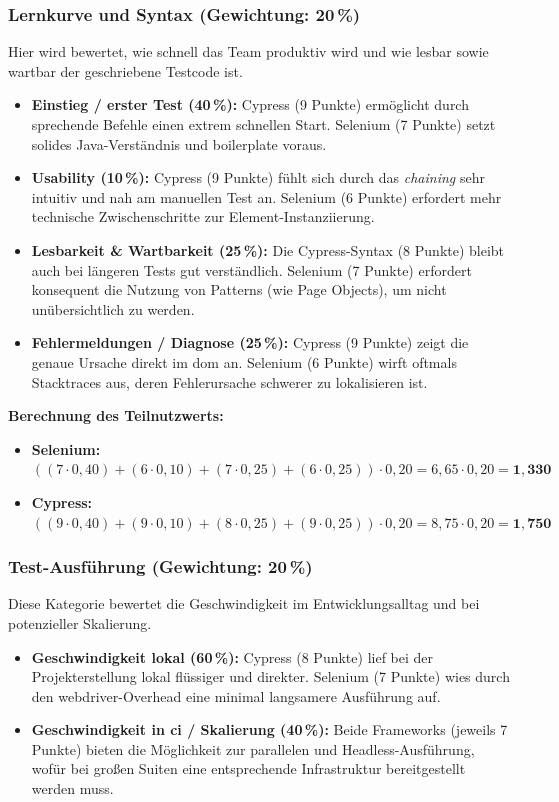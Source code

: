\subsubsection{Lernkurve und Syntax (Gewichtung: 20\,\%)}
\label{sec:eval_lernkurve}
Hier wird bewertet, wie schnell das Team produktiv wird und wie lesbar sowie wartbar der geschriebene Testcode ist.
\begin{itemize}
    \item \textbf{Einstieg / erster Test (40\,\%):} Cypress (9 Punkte) ermöglicht durch sprechende Befehle einen extrem schnellen Start. Selenium (7 Punkte) setzt solides Java-Verständnis und \gls{boilerplate} voraus.
    \item \textbf{Usability (10\,\%):} Cypress (9 Punkte) fühlt sich durch das \textit{\gls{chaining}} sehr intuitiv und nah am manuellen Test an. Selenium (6 Punkte) erfordert mehr technische Zwischenschritte zur Element-Instanziierung.
    \item \textbf{Lesbarkeit \& Wartbarkeit (25\,\%):} Die Cypress-Syntax (8 Punkte) bleibt auch bei längeren Tests gut verständlich. Selenium (7 Punkte) erfordert konsequent die Nutzung von Patterns (wie Page Objects), um nicht unübersichtlich zu werden.
    \item \textbf{Fehlermeldungen / Diagnose (25\,\%):} Cypress (9 Punkte) zeigt die genaue Ursache direkt im \gls{dom} an. Selenium (6 Punkte) wirft oftmals Stacktraces aus, deren Fehlerursache schwerer zu lokalisieren ist.
\end{itemize}

\textbf{Berechnung des Teilnutzwerts:}
\begin{itemize}
    \item[] \textbf{Selenium:} $((7 \cdot 0{,}40) + (6 \cdot 0{,}10) + (7 \cdot 0{,}25) + (6 \cdot 0{,}25)) \cdot 0{,}20 = 6{,}65 \cdot 0{,}20 = \mathbf{1{,}330}$
    \item[] \textbf{Cypress:} $((9 \cdot 0{,}40) + (9 \cdot 0{,}10) + (8 \cdot 0{,}25) + (9 \cdot 0{,}25)) \cdot 0{,}20 = 8{,}75 \cdot 0{,}20 = \mathbf{1{,}750}$
\end{itemize}


\subsubsection{Test-Ausführung (Gewichtung: 20\,\%)}
\label{sec:eval_ausfuehrung}
Diese Kategorie bewertet die Geschwindigkeit im Entwicklungsalltag und bei potenzieller Skalierung.
\begin{itemize}
    \item \textbf{Geschwindigkeit lokal (60\,\%):} Cypress (8 Punkte) lief bei der Projekterstellung lokal flüssiger und direkter. Selenium (7 Punkte) wies durch den \gls{webdriver}-Overhead eine minimal langsamere Ausführung auf.
    \item \textbf{Geschwindigkeit in \gls{ci} / Skalierung (40\,\%):} Beide Frameworks (jeweils 7 Punkte) bieten die Möglichkeit zur parallelen und Headless-Ausführung, wofür bei großen Suiten eine entsprechende Infrastruktur bereitgestellt werden muss.
\end{itemize}

